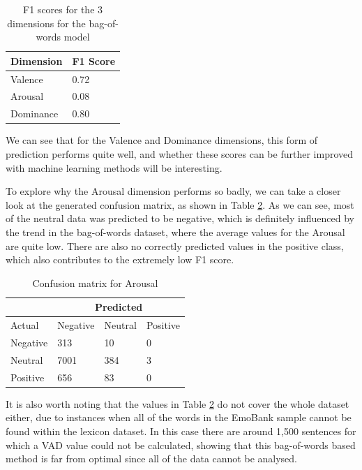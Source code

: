 \begin{table}
\centering
\caption{F1 scores for the 3 dimensions for the bag-of-words model}
\begin{tabular}{ |p{3cm}|p{3cm}|}
 \hline
  Dimension & F1 Score \\
 \hline
  Valence & 0.72\\
  Arousal & 0.08 \\
  Dominance & 0.80\\
 \hline
\end{tabular}
\label{lexicon:f1}
\end{table}

We can see that for the Valence and Dominance dimensions, this form of prediction performs quite well, and whether these scores can be further improved with machine learning methods will be interesting.

To explore why the Arousal dimension performs so badly, we can take a closer look at the generated confusion matrix, as shown in Table \ref{lexicon:a:conmat}. As we can see, most of the neutral data was predicted to be negative, which is definitely influenced by the trend in the bag-of-words dataset, where the average values for the Arousal are quite low. There are also no correctly predicted values in the positive class, which also contributes to the extremely low F1 score.

\begin{table}
\centering
\caption{Confusion matrix for Arousal}
\begin{tabular}{ |p{3cm}|p{3cm}|p{3cm}|p{3cm}| }
 \hline
  & \multicolumn{3}{|c|}{Predicted} \\
 \hline
   Actual & Negative & Neutral & Positive \\
    \hline
    Negative &  313   &  10  & 0 \\
    Neutral & 7001 & 384 &  3 \\
    Positive & 656 & 83 &  0 \\
 \hline
\end{tabular}
\label{lexicon:a:conmat}
\end{table}


It is also worth noting that the values in Table \ref{lexicon:a:conmat} do not cover the whole dataset either, due to instances when all of the words in the EmoBank sample cannot be found within the lexicon dataset. In this case there are around 1,500 sentences for which a VAD value could not be calculated, showing that this bag-of-words based method is far from optimal since all of the data cannot be analysed.

